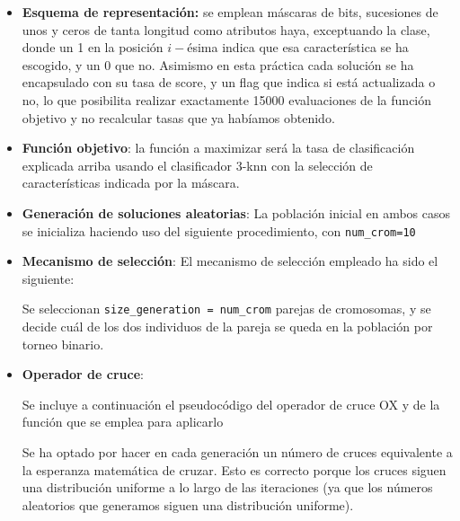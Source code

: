 \documentclass[a4paper,11pt]{article}
\begin{document}
\begin{itemize} 
\item \textbf{Esquema de representación:} se emplean máscaras de bits, sucesiones de unos y ceros de tanta longitud como atributos haya,
exceptuando la clase, donde un 1 en la posición $i-$ésima indica que esa característica se ha escogido, y un $0$ que no.
Asimismo en esta práctica cada solución se ha encapsulado con su tasa de score, y un flag que indica si está actualizada o
no, lo que posibilita realizar exactamente 15000 evaluaciones de la función objetivo y no recalcular tasas que ya habíamos
obtenido.

\item \textbf{Función objetivo}: la función a maximizar será la tasa de clasificación explicada arriba usando el clasificador
3-knn con la selección de características indicada por la máscara.\\

  \small\texttt{}
  \normalsize
  
\item \textbf{Generación de soluciones aleatorias}:
  La población inicial en ambos casos se inicializa haciendo uso del siguiente procedimiento, con \texttt{num\_crom=10}\\
  
  \small\texttt{}
  \normalsize

\item \textbf{Mecanismo de selección}:
  El mecanismo de selección empleado ha sido el siguiente:
  
  Se seleccionan \texttt{size\_generation = num\_crom} parejas de cromosomas, y se decide cuál de los dos individuos de la pareja se 
  queda en la población por torneo binario.\\
  
  \small\texttt{}
  \normalsize
  
  
\item \textbf{Operador de cruce}:

  Se incluye a continuación el pseudocódigo del operador de cruce OX y de la función que se emplea para aplicarlo\\

  \small\texttt{}
  \normalsize

  
  Se ha optado por hacer en cada generación un número de cruces equivalente a la esperanza matemática de cruzar. Esto es
  correcto porque los cruces siguen una distribución uniforme a lo largo de las iteraciones (ya que los números aleatorios
  que generamos siguen una distribución uniforme).
  

\end{itemize}
\end{document}
